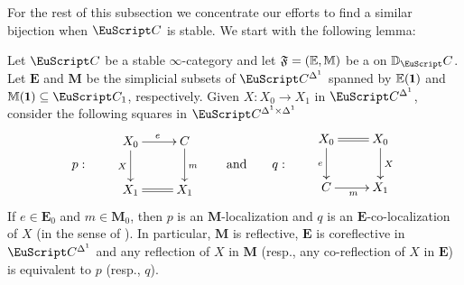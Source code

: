 For the rest of this subsection we concentrate our efforts to find a similar bijection when $\iC$ is stable. We start with the following lemma:

\begin{lemma}\label{lemma_infinity_orth}
Let $\iC$ be a stable $\infty$-category and let $\mathfrak{F}=(\mathbb E,\mathbb M)$ be a \dfs on $\D_\iC$. Let $\mathbf{E}$ and $\mathbf M$ be the simplicial subsets of $\iC^{\Delta^1}$ spanned by $\mathbb E(\uno)$ and $\mathbb M(\uno)\subseteq \iC_1$, respectively. Given $X\colon X_0\to X_1$ in $\iC^{\Delta^1}$, consider the following squares in $\iC^{\Delta^1\times \Delta^1}$
\[
p:\qquad\begin{matrix}\xymatrix{
X_0\ar[r]^e\ar[d]_X&C\ar[d]^m\\
X_1\ar@{=}[r]&X_1
}\end{matrix}
\qquad
\text{and}
\qquad
q:\qquad\begin{matrix}\xymatrix{
X_0\ar@{=}[r]\ar[d]_e&X_0\ar[d]^X\\
C\ar[r]_{m}&X_1
}\end{matrix}
\]
If $e\in \mathbf E_0$ and $m\in \mathbf M_0$, then $p$ is an $\mathbf M$-localization and $q$ is an $\mathbf E$-co-localization of $X$ (in the sense of \cite[\adef\textbf{5.2.7.6}]{HTT}). In particular, $\mathbf M$ is reflective, $\mathbf E$ is coreflective in $\iC^{\Delta^1}$ and any reflection of $X$ in $\mathbf M$ (resp., any co-reflection of $X$ in $\mathbf E$) is equivalent to $p$ (resp., $q$).
\end{lemma}

